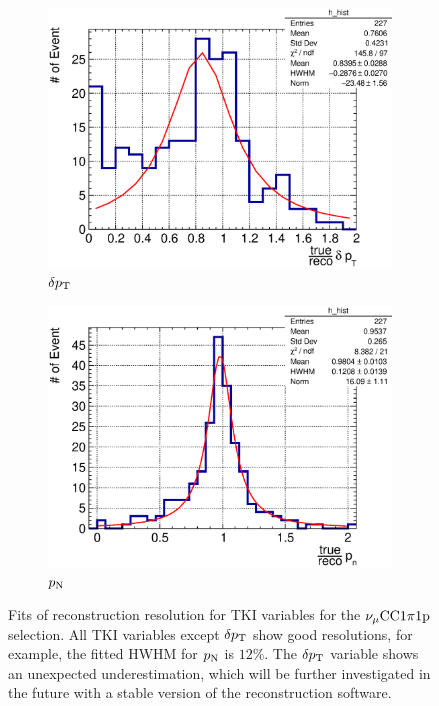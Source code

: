 \begin{figure}
          \\
          \begin{subfigure}[b]{\dbfigwid\textwidth}
               \centering
               \includegraphics[width=\textwidth]{figures/perf/tki/SFGpTPCmu_dpt_rat_hist_al14.eps}
               \caption{$\delta p_\textrm{T}$}
               \label{subfig:1pi-dpt}
          \end{subfigure}
          \begin{subfigure}[b]{\dbfigwid\textwidth}
               \centering
               \includegraphics[width=\textwidth]{figures/perf/tki/SFGpTPCmu_pn_rat_hist_al14.eps}
               \caption{$p_\textrm{N}$}
               \label{subfig:1pi-pn}
          \end{subfigure}
          \caption{Fits of reconstruction resolution for TKI variables for the $\nu_{\mu}\textrm{CC}1\pi1\textrm{p}$ selection. All TKI variables except $\delta p_\textrm{T}$ show good resolutions, for example, the fitted HWHM for $p_\textrm{N}$ is $12\%$. The $\delta p_\textrm{T}$ variable shows an unexpected underestimation, which will be further investigated in the future with a stable version of the reconstruction software.}
          \label{fig:mc-tki-1pi}
     \end{figure}

